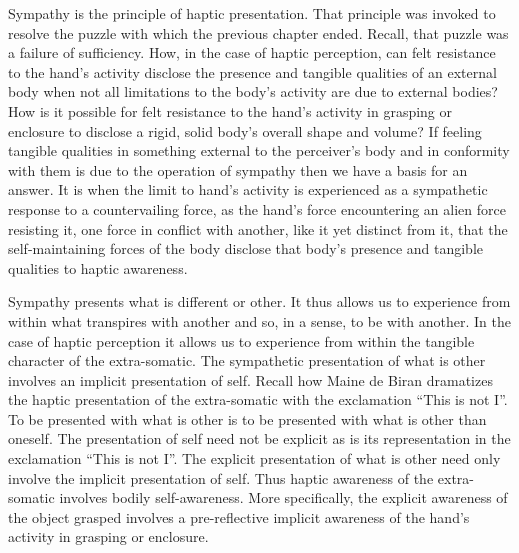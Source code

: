 Sympathy is the principle of haptic presentation. That principle was invoked to resolve the puzzle with which the previous chapter ended. Recall, that puzzle was a failure of sufficiency. How, in the case of haptic perception, can felt resistance to the hand's activity disclose the presence and tangible qualities of an external body when not all limitations to the body's activity are due to external bodies? How is it possible for felt resistance to the hand’s activity in grasping or enclosure to disclose a rigid, solid body’s overall shape and volume? If feeling tangible qualities in something external to the perceiver’s body and in conformity with them is due to the operation of sympathy then we have a basis for an answer. It is when the limit to hand’s activity is experienced as a sympathetic response to a countervailing force, as the hand’s force encountering an alien force resisting it, one force in conflict with another, like it yet distinct from it, that the self-maintaining forces of the body disclose that body’s presence and tangible qualities to haptic awareness.

Sympathy presents what is different or other. It thus allows us to experience from within what transpires with another and so, in a sense, to be with another. In the case of haptic perception it allows us to experience from within the tangible character of the extra-somatic. The sympathetic presentation of what is other involves an implicit presentation of self. Recall how Maine de Biran dramatizes the haptic presentation of the extra-somatic with the exclamation ``This is not I''. To be presented with what is other is to be presented with what is other than oneself. The presentation of self need not be explicit as is its representation in  the exclamation ``This is not I''. The explicit presentation of what is other need only involve the implicit presentation of self. Thus haptic awareness of the extra-somatic involves bodily self-awareness. More specifically, the explicit awareness of the object grasped involves a pre-reflective implicit awareness of the hand's activity in grasping or enclosure.

